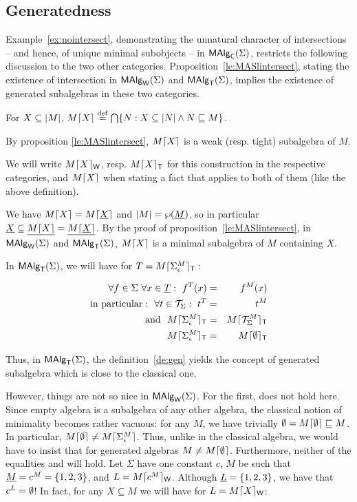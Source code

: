 \documentclass[10pt]{article}
\begin{document}

\subsection{Generatedness}

Example~\ref{ex:nointersect}, demonstrating the unnatural character of
intersections -- and hence, of unique minimal subobjects -- in
$\mbox{\rm\sf MAlg}_{\sf C}(\Sigma)$, restricts the following discussion to the two other
categories.  Proposition~\ref{le:MASlintersect}, stating the existence
of intersection in $\mbox{\rm\sf MAlg}_{\sf W}(\Sigma)$ and $\mbox{\rm\sf MAlg}_{\sf T}(\Sigma)$, implies the existence of
generated subalgebras in these two categories.

\begin{Definition}
\label{de:gen}
For $X\subseteq|M|$, $M\lceil X \rceil \stackrel{{\rm \tiny{def}}}= \bigcap \{N:X\subseteq|N|\land N\mathrel{\sqsubseteq} M\}$.
\end{Definition}

\noindent
By proposition \ref{le:MASlintersect}, $M\lceil X \rceil$ is a weak
(resp. tight) subalgebra of $M$.

We will write $M\lceil X \rceil_{\sf W}$, resp. $M\lceil X \rceil_{\sf T}$ for this construction
in the respective categories, and $M\lceil X \rceil$ when stating a fact that
applies to both of them (like the above definition).

We have $M\lceil X \rceil=M\lceil \underline {X} \rceil$ and $|M|=\wp(\underline {M})$,
so in particular $\underline {X}\subseteq\underline {M\lceil X \rceil}=\underline {M\lceil \underline {X} \rceil}$.  By the proof of
proposition~\ref{le:MASlintersect}, in $\mbox{\rm\sf MAlg}_{\sf W}(\Sigma)$ and $\mbox{\rm\sf MAlg}_{\sf T}(\Sigma)$, $M\lceil X \rceil$ is a minimal subalgebra of $M$ containing $X$.


In $\mbox{\rm\sf MAlg}_{\sf T}(\Sigma)$, we will have for $T=M\lceil \Sigma_{\epsilon}^M \rceil_{\sf T}:$

\begin{eqnarray}
\forall f\in\Sigma\ \forall x\in\underline {T}:\ f^T(x) 
& = & f^M(x) \label{eq:Tb} \\ 
{\rm in\ particular:\ \ }\forall t\in{\cal T}_{\Sigma}:\ t^T 
& = & t^M \nonumber \\ 
{\rm and\ \ }M\lceil \Sigma_{\epsilon}^M \rceil_{\sf T} 
& = & M\lceil {\cal T}_{\Sigma}^M \rceil_{\sf T} \label{eq:Ta} \\
M\lceil \Sigma_{\epsilon}^M \rceil_{\sf T} 
& = & M\lceil \emptyset \rceil_{\sf T} \label{eq:Tc}
\end{eqnarray}

Thus, in $\mbox{\rm\sf MAlg}_{\sf T}(\Sigma)$, the definition~\ref{de:gen} yields the concept of
generated subalgebra which is close to the classical one.

However, things are not so nice in $\mbox{\rm\sf MAlg}_{\sf W}(\Sigma)$. For the first, 
does not hold here. Since empty algebra is a subalgebra of any other
algebra, the classical notion of minimality becomes rather vacuous:
for any $M$, we have trivially $\emptyset=M\lceil \emptyset \rceil\mathrel{\sqsubseteq} M$. In particular,
$M\lceil \emptyset \rceil\not= M\lceil \Sigma_{\epsilon}^M \rceil$.  Thus, unlike in the classical
algebra, we would have to insist that for generated algebras
$M\not=M\lceil \emptyset \rceil$.  Furthermore, neither of the equalities 
and  will hold. Let $\Sigma$ have one constant $c$, $M$ be
such that $\underline {M}=c^M=\{1,2,3\}$, and $L=M\lceil c^M \rceil_{\sf W}$. Although
$\underline {L}=\{1,2,3\}$, we have that $c^L=\emptyset$! In fact, for any
$X\subseteq M$ we will have for $L = M\lceil X \rceil_{\sf W}$:
\end{document}
